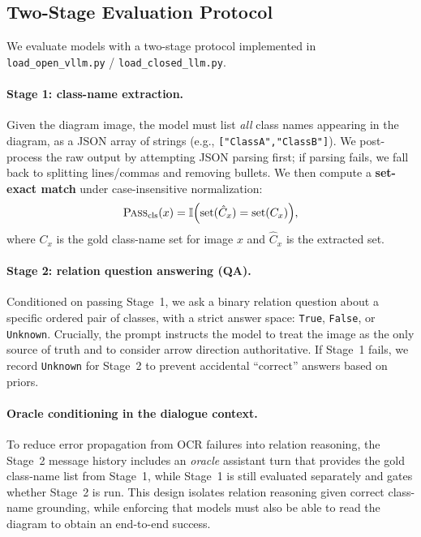 \documentclass[11pt]{article}
\begin{document}
\subsection{Two-Stage Evaluation Protocol}
\label{sec:two-stage}
We evaluate models with a two-stage protocol implemented in \texttt{load\_open\_vllm.py} / \texttt{load\_closed\_llm.py}.

\paragraph{Stage 1: class-name extraction.}
Given the diagram image, the model must list \emph{all} class names appearing in the diagram, as a JSON array of strings (e.g., \texttt{["ClassA","ClassB"]}).
We post-process the raw output by attempting JSON parsing first; if parsing fails, we fall back to splitting lines/commas and removing bullets.
We then compute a \textbf{set-exact match} under case-insensitive normalization:
\begin{equation}
\textsc{Pass}_{\text{cls}}(x) = \mathbb{I}\Big(\mathrm{set}(\hat{C}_x)=\mathrm{set}(C_x)\Big),
\end{equation}
where $C_x$ is the gold class-name set for image $x$ and $\hat{C}_x$ is the extracted set.

\paragraph{Stage 2: relation question answering (QA).}
Conditioned on passing Stage~1, we ask a binary relation question about a specific ordered pair of classes, with a strict answer space:
\texttt{True}, \texttt{False}, or \texttt{Unknown}.
Crucially, the prompt instructs the model to treat the image as the only source of truth and to consider arrow direction authoritative.
If Stage~1 fails, we record \texttt{Unknown} for Stage~2 to prevent accidental ``correct'' answers based on priors.

\paragraph{Oracle conditioning in the dialogue context.}
To reduce error propagation from OCR failures into relation reasoning, the Stage~2 message history includes an \emph{oracle} assistant turn that provides the gold class-name list from Stage~1, while Stage~1 is still evaluated separately and gates whether Stage~2 is run.
This design isolates relation reasoning given correct class-name grounding, while enforcing that models must also be able to read the diagram to obtain an end-to-end success.
\end{document}
